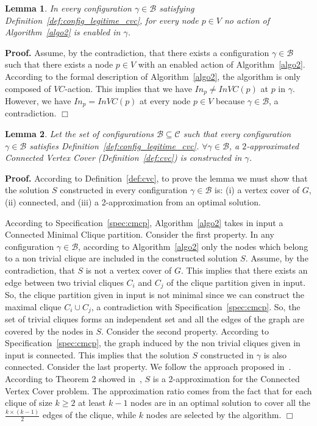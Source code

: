 \documentclass[11pt,letterpaper,onecolumn]{article}
\newtheorem{lemma}{Lemma}
\newenvironment{proof}{\noindent \begin{rm}{\textbf{Proof.} }}{\hspace*{\fill}$\Box$\par\end{rm} \vspace{.3cm}}
\begin{document}
\begin{lemma}
\label{lem:no_enable_action_cvc}
In every configuration $\gamma \in \mathcal{B}$ satisfying Definition~\ref{def:config_legitime_cvc}, for every node $p \in V$ no action of Algorithm~\ref{algo2} is enabled in $\gamma$.
\end{lemma}

\begin{proof}
Assume, by the contradiction, that there exists a configuration $\gamma \in \mathcal{B}$ such that there exists a node $p \in V$ with an enabled action of Algorithm~\ref{algo2}. According to the formal description of Algorithm~\ref{algo2}, the algorithm is only composed of $VC$-action. This implies that we have $In_p \neq InVC(p)$ at $p$ in $\gamma$. However, we have $In_p=InVC(p)$ at every node $p \in V$ because $\gamma \in \mathcal{B}$, a contradiction.
\end{proof}

\begin{lemma}
\label{lem:sol_cvc_config_legitime}
Let the set of configurations $\mathcal{B} \subseteq \mathcal{C}$ such that every configuration $\gamma \in \mathcal{B}$ satisfies Definition~\ref{def:config_legitime_cvc}. $\forall \gamma \in \mathcal{B}$, a $2$-approximated Connected Vertex Cover (Definition~\ref{def:cvc}) is constructed in $\gamma$.
\end{lemma}

\begin{proof}
According to Definition~\ref{def:cvc}, to prove the lemma we must show that the solution $S$ constructed in every configuration $\gamma \in \mathcal{B}$ is: (i) a vertex cover of $G$, (ii) connected, and (iii) a 2-approximation from an optimal solution.

According to Specification~\ref{spec:cmcp}, Algorithm~\ref{algo2} takes in input a Connected Minimal Clique partition. Consider the first property. In any configuration $\gamma \in \mathcal{B}$, according to Algorithm~\ref{algo2} only the nodes which belong to a non trivial clique are included in the constructed solution $S$. Assume, by the contradiction, that $S$ is not a vertex cover of $G$. This implies that there exists an edge between two trivial cliques $C_i$ and $C_j$ of the clique partition given in input. So, the clique partition given in input is not minimal since we can construct the maximal clique $C_i \cup C_j$, a contradiction with Specification~\ref{spec:cmcp}. So, the set of trivial cliques forms an independent set and all the edges of the graph are covered by the nodes in $S$. Consider the second property. According to Specification~\ref{spec:cmcp}, the graph induced by the non trivial cliques given in input is connected. This implies that the solution $S$ constructed in $\gamma$ is also connected. Consider the last property. We follow the approach proposed in~\cite{DelbotLP13}. According to Theorem 2 showed in~\cite{DelbotLP13}, $S$ is a 2-approximation for the Connected Vertex Cover problem. The approximation ratio comes from the fact that for each clique of size $k \geq 2$ at least $k-1$ nodes are in an optimal solution to cover all the $\frac{k \times (k-1)}{2}$ edges of the clique, while $k$ nodes are selected by the algorithm.
\end{proof}
\end{document}
